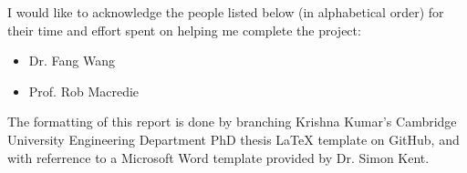 
\begin{acknowledgements}      

I would like to acknowledge the people listed below (in alphabetical order) for their time and effort spent on helping 
me complete the project:

\begin{itemize}
    \item Dr. Fang Wang
    \item Prof. Rob Macredie
\end{itemize}

The formatting of this report is done by branching Krishna Kumar's Cambridge University Engineering Department PhD thesis 
LaTeX template on GitHub, and with referrence to a Microsoft Word template provided by Dr. Simon Kent.

\end{acknowledgements}
